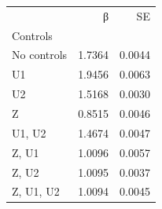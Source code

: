 \begin{tabular}{lrr}
\toprule
 & β & SE \\
Controls &  &  \\
\midrule
No controls & 1.7364 & 0.0044 \\
U1 & 1.9456 & 0.0063 \\
U2 & 1.5168 & 0.0030 \\
Z & 0.8515 & 0.0046 \\
U1, U2 & 1.4674 & 0.0047 \\
Z, U1 & 1.0096 & 0.0057 \\
Z, U2 & 1.0095 & 0.0037 \\
Z, U1, U2 & 1.0094 & 0.0045 \\
\bottomrule
\end{tabular}
